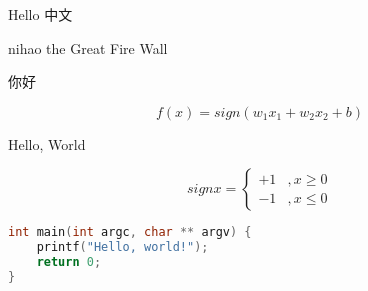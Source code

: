 \documentclass{article}
\begin{document}
Hello    中文

nihao the Great Fire Wall

{ 你好}

\begin{equation}
	f(x)=sign(w_1x_1 + w_2x_2 + b)
\end{equation}

{\setmainfont{BrushScriptStd} Hello, World}

    \begin{equation}
sign{x} =
\begin{cases}
+1&, x \geq 0\\
-1&, x \le 0 
\end{cases}
\end{equation}

\begin{lstlisting}[language=C]
int main(int argc, char ** argv) {
    printf("Hello, world!");
    return 0;
}
\end{lstlisting}
\end{document}

